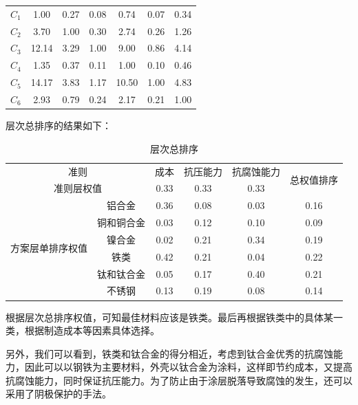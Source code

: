 \documentclass{article}
\begin{document}
\begin{table}[H]
\begin{tabular}{ccccccc}
  		$C_1$     & 1.00  & 0.27  & 0.08  & 0.74  & 0.07  & 0.34 \\
  		$C_2$     & 3.70  & 1.00  & 0.30  & 2.74  & 0.26  & 1.26 \\
  		$C_3$     & 12.14 & 3.29  & 1.00  & 9.00  & 0.86  & 4.14 \\
  		$C_4$     & 1.35  & 0.37  & 0.11  & 1.00  & 0.10  & 0.46 \\
  		$C_5$     & 14.17 & 3.83  & 1.17  & 10.50 & 1.00  & 4.83 \\
  		$C_6$     & 2.93  & 0.79  & 0.24  & 2.17  & 0.21  & 1.00 \\
  		\bottomrule[1.5pt]
  	\end{tabular}%
  	\label{}%
  \end{table}%
  层次总排序的结果如下：
 \begin{table}[H]
 	\centering
 	\caption{层次总排序}
 	\begin{tabular}{c|c|ccc|c}
 		\toprule[1.5pt]
 		\multicolumn{2}{c|}{准则} & 成本    & 抗压能力  & 抗腐蚀能力 & \multirow{2}[4]{*}{总权值排序} \\
 		\cmidrule{1-5}    \multicolumn{2}{c|}{准则层权值} & 0.33  & 0.33  & 0.33  &  \\
 		\midrule[1.5pt]
 		\multirow{6}[2]{*}{方案层单排序权值} & 铝合金   & 0.36  & 0.08  & 0.03  & 0.16 \\
 		& 铜和铜合金 & 0.03  & 0.12  & 0.10  & 0.09 \\
 		& 镍合金   & 0.02  & 0.21  & 0.34  & 0.19 \\
 		& 铁类    & 0.42  & 0.21  & 0.04  & 0.22 \\
 		& 钛和钛合金 & 0.05  & 0.17  & 0.40  & 0.21 \\
 		& 不锈钢   & 0.13  & 0.19  & 0.08  & 0.14 \\
 		\bottomrule[1.5pt]
 	\end{tabular}%
 	\label{}%
 \end{table}%
  根据层次总排序权值，可知最佳材料应该是铁类。最后再根据铁类中的具体某一类，根据制造成本等因素具体选择。
  
  另外，我们可以看到，铁类和钛合金的得分相近，考虑到钛合金优秀的抗腐蚀能力，因此可以以钢铁为主要材料，外壳以钛合金为涂料，这样即节约成本，又提高抗腐蚀能力，同时保证抗压能力。为了防止由于涂层脱落导致腐蚀的发生，还可以采用了阴极保护的手法。
 
    
\end{document}
